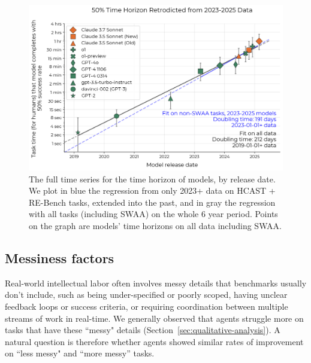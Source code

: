 \documentclass{article}
\newcommand{\gabenchmark}{HCAST}
\begin{document}
\begin{figure}
    \centering
    \includegraphics[width=0.8\linewidth]{plots/logistic/double_line_all_data_retrodict_excluding_swaa.png}
    \caption{The full time series for the time horizon of models, by release date. We plot in blue the regression from only 2023+ data on \gabenchmark{} + RE-Bench tasks, extended into the past, and in gray the regression with all tasks (including SWAA) on the whole 6 year period. Points on the graph are models' time horizons on all data including SWAA.}
    \label{fig:retro}
\end{figure}

\subsection{Messiness factors}\label{sec:messiness-split}

Real-world intellectual labor often involves messy details that benchmarks usually don't include, such as being under-specified or poorly scoped, having unclear feedback loops or success criteria, or requiring coordination between multiple streams of work in real-time. We generally observed that agents struggle more on tasks that have these ``messy" details (Section~\ref{sec:qualitative-analysis}). A natural question is therefore whether agents showed similar rates of improvement on ``less messy" and ``more messy'' tasks.
\end{document}
